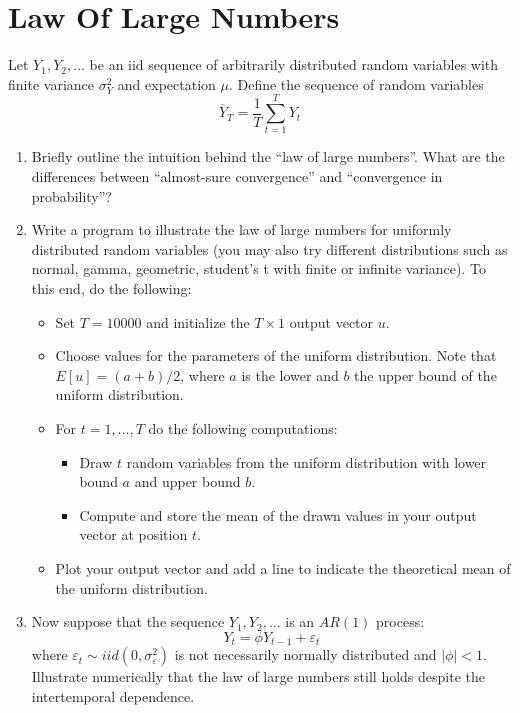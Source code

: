 \section[Law Of Large Numbers]{Law Of Large Numbers\label{ex:LawOfLargeNumbers}}
Let \(Y_{1},Y_{2},\ldots \) be an iid sequence of arbitrarily distributed random variables
  with finite variance \(\sigma_Y ^{2}\) and expectation \(\mu\).
Define the sequence of random variables
\begin{equation*}
\overline{Y}_{T}=\frac{1}{T}\sum_{t=1}^{T}Y_{t}
\end{equation*}
\begin{enumerate}
\item Briefly outline the intuition behind the \enquote{law of large numbers}.
What are the differences between \enquote{almost-sure convergence}
  and \enquote{convergence in probability}?
\item Write a program to illustrate the law of large numbers for uniformly distributed random variables
  (you may also try different distributions such as normal, gamma, geometric, student's t with finite or infinite variance).
To this end, do the following:
\begin{itemize}
	\item Set \(T=10000\) and initialize the \(T \times 1\) output vector \(u\).
	\item Choose values for the parameters of the uniform distribution.
	Note that \(E[u] = (a+b)/2\), where \(a\) is the lower and \(b\) the upper bound of the uniform distribution.
	\item For \(t=1,\ldots,T\) do the following computations:
	\begin{itemize}
		\item Draw \(t\) random variables from the uniform distribution with lower bound \(a\) and upper bound \(b\).
		\item Compute and store the mean of the drawn values in your output vector at position \(t\).
	\end{itemize}
	\item Plot your output vector and add a line to indicate the theoretical mean of the uniform distribution.
\end{itemize}
\item Now suppose that the sequence \(Y_{1},Y_{2},\ldots \) is an \(AR(1)\) process:
\[Y_{t} =\phi Y_{t-1} +\varepsilon _{t}\]
where \(\varepsilon _{t}\sim iid(0,\sigma _{\varepsilon }^{2})\) is not necessarily normally distributed and \(|\phi |<1\).
Illustrate numerically that the law of large numbers still holds despite the intertemporal dependence.
\end{enumerate}

